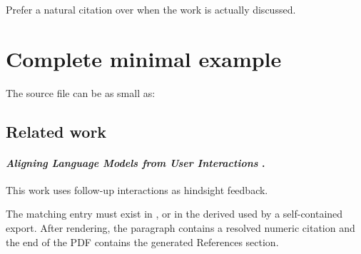 Prefer a natural citation over \code{\nocite} when the work is actually discussed.

\section*{Complete minimal example}

The source file  can be as small as:

\begin{DocCode}


\section*{Related work}

\paragraph{
  \emph{Aligning Language Models from User Interactions}
  \citep{kleinebuening2026aligning}.
}
This work uses follow-up interactions as hindsight feedback.

\manualBibliography


\end{DocCode}

The matching entry must exist in , or in the derived
 used by a self-contained export.
After rendering, the paragraph contains a resolved numeric citation and the end of the PDF contains the generated References section.


